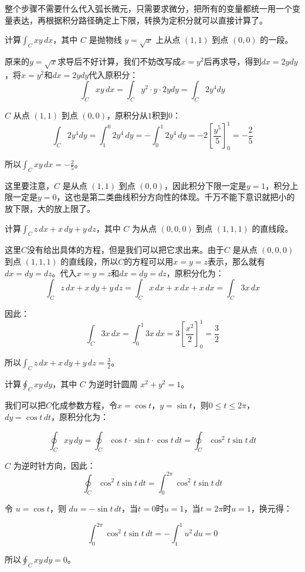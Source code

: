 整个步骤不需要什么代入弧长微元，只需要求微分，把所有的变量都统一用一个变量表达，再根据积分路径确定上下限，转换为定积分就可以直接计算了。

\begin{myexample}
    计算\(\int_C xy\,dx\)，其中 $C$ 是抛物线 $y = \sqrt{x}$ 上从点 $(1,1)$ 到点 $(0,0)$ 的一段。

    原来的$y = \sqrt{x}$求导后不好计算，我们不妨改写成$x = y^2$后再求导，得到\(dx=2ydy\)，将$x = y^2$和\(dx=2ydy\)代入原积分：
    \[
    \int_C xy\,dx=\int_C y^2\cdot y\cdot 2ydy=\int_C 2y^4dy
    \]

    $C$ 从点 $(1,1)$ 到点 $(0,0)$，原积分从\(1\)积到\(0\)：
    \[
    \int_C 2y^4dy=\int_{1}^{0} 2y^4\,dy=-\int_{0}^{1} 2y^4\,dy =-2\left[ \frac{y^5}{5} \right]_{0}^{1}= -\frac{2}{5}
    \]

    所以\(\int_C xy\,dx=-\frac{2}{5}\)。
\end{myexample}

这里要注意，$C$ 是从点 $(1,1)$ 到点 $(0,0)$，因此积分下限一定是$y=1$，积分上限一定是$y=0$，这也是第二类曲线积分方向性的体现。千万不能下意识就把小的放下限，大的放上限了。

\begin{myexample}
    计算\(\int_C z\,dx + x\,dy + y\,dz\)，其中 $C$ 为从点 $(0,0,0)$ 到点 $(1,1,1)$ 的直线段。

    这里$C$没有给出具体的方程，但是我们可以把它求出来。由于$C$ 是从点 $(0,0,0)$ 到点 $(1,1,1)$ 的直线段，所以$C$的方程可以用$x=y=z$表示，那么就有$dx=dy=dz$。代入$x=y=z$和$dx=dy=dz$，原积分化为：
\[
    \int_C z\,dx + x\,dy + y\,dz=\int_C x\,dx + x\,dx + x\,dx=\int_C 3x\,dx\]

    因此：
    \[
    \int_C 3x\,dx=\int_0^1 3x\,dx=3\left[ \frac{x^2}{2} \right]_{0}^{1}=\frac32
    \]

    所以\(\int_C z\,dx + x\,dy + y\,dz=\frac32\)。
\end{myexample}

\begin{myexample}
    计算\(\oint_C xy\,dy\)，其中 $C$ 为逆时针圆周 \(x^2+y^2=1\)。

    我们可以把$C$化成参数方程，令\(x = \cos t\)，\(y = \sin t\)，则\(0 \le t \le 2\pi\)，\(dy = \cos t\,dt\)，原积分化为：

    \[
\oint_C xy\,dy
= \oint_C \cos t \cdot \sin t \cdot \cos t\,dt
= \oint_C \cos^2 t \sin t\,dt
\]

$C$ 为逆时针方向，因此：
\[
\oint_C \cos^2 t \sin t\,dt=\int_0^{2\pi} \cos^2 t \sin t\,dt
\]

令 \(u = \cos t\)，则 \(du = -\sin t\,dt\)，当\(t=0\)时\(u=1\)，当\(t=2\pi\)时\(u=1\)，换元得：

\[
\int_0^{2\pi} \cos^2 t \sin t\,dt=-\int_1^1 u^2\,du=0
\]

所以\(\oint_C xy\,dy=0\)。
\end{myexample}

